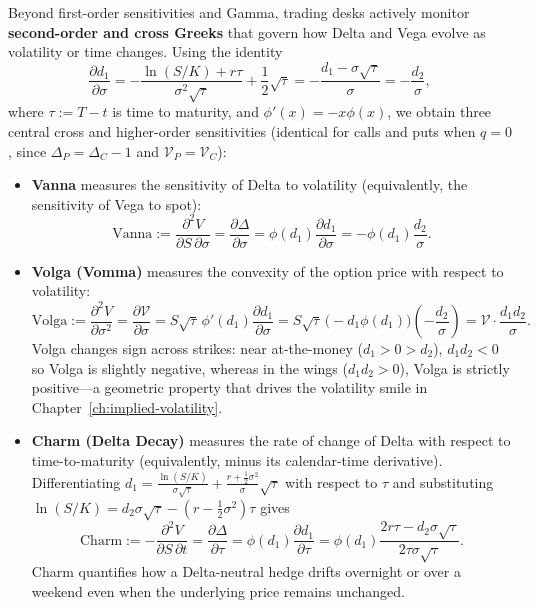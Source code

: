Beyond first-order sensitivities and Gamma, trading desks actively monitor \textbf{second-order and cross Greeks} that govern how Delta and Vega evolve as volatility or time changes. Using the identity
\[
    \frac{\partial d_1}{\partial \sigma}
    = -\frac{\ln(S / K) + r\tau}{\sigma^2\sqrt{\tau}} + \frac{1}{2}\sqrt{\tau}
    = -\frac{d_1 - \sigma\sqrt{\tau}}{\sigma}
    = -\frac{d_2}{\sigma},
\]
where $\tau := T - t$ is time to maturity, and $\phi'(x) = -x\phi(x)$, we obtain three central cross and higher-order sensitivities (identical for calls and puts when $q = 0$, since $\Delta_P = \Delta_C - 1$ and $\mathcal{V}_P = \mathcal{V}_C$):
\begin{itemize}
    \item \textbf{Vanna} measures the sensitivity of Delta to volatility (equivalently, the sensitivity of Vega to spot):
    \begin{equation}
        \label{eq:ch04-vanna}
        \mathrm{Vanna}
        := \frac{\partial^2 V}{\partial S\,\partial \sigma}
        = \frac{\partial \Delta}{\partial \sigma}
        = \phi(d_1)\frac{\partial d_1}{\partial \sigma}
        = -\phi(d_1)\frac{d_2}{\sigma}.
    \end{equation}
    \item \textbf{Volga (Vomma)} measures the convexity of the option price with respect to volatility:
    \begin{equation}
        \label{eq:ch04-volga}
        \mathrm{Volga}
        := \frac{\partial^2 V}{\partial \sigma^2}
        = \frac{\partial \mathcal{V}}{\partial \sigma}
        = S\sqrt{\tau}\,\phi'(d_1)\frac{\partial d_1}{\partial \sigma}
        = S\sqrt{\tau}\,\bigl(-d_1\phi(d_1)\bigr)\!\left(-\frac{d_2}{\sigma}\right)
        = \mathcal{V}\cdot\frac{d_1 d_2}{\sigma}.
    \end{equation}
    Volga changes sign across strikes: near at-the-money ($d_1 > 0 > d_2$), $d_1 d_2 < 0$ so Volga is slightly negative, whereas in the wings ($d_1 d_2 > 0$), Volga is strictly positive---a geometric property that drives the volatility smile in Chapter~\ref{ch:implied-volatility}.
    \item \textbf{Charm (Delta Decay)} measures the rate of change of Delta with respect to time-to-maturity (equivalently, minus its calendar-time derivative). Differentiating $d_1 = \frac{\ln(S/K)}{\sigma\sqrt{\tau}} + \frac{r + \frac{1}{2}\sigma^2}{\sigma}\sqrt{\tau}$ with respect to $\tau$ and substituting $\ln(S/K) = d_2\sigma\sqrt{\tau} - (r - \frac{1}{2}\sigma^2)\tau$ gives
    \begin{equation}
        \label{eq:ch04-charm}
        \mathrm{Charm}
        := -\frac{\partial^2 V}{\partial S\,\partial t}
        = \frac{\partial \Delta}{\partial \tau}
        = \phi(d_1)\frac{\partial d_1}{\partial \tau}
        = \phi(d_1)\frac{2r\tau - d_2\sigma\sqrt{\tau}}{2\tau\sigma\sqrt{\tau}}.
    \end{equation}
    Charm quantifies how a Delta-neutral hedge drifts overnight or over a weekend even when the underlying price remains unchanged.
\end{itemize}

